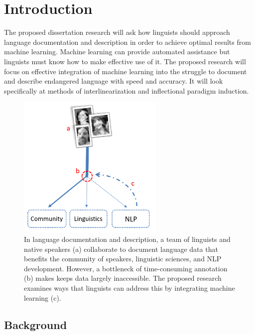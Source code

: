 \chapter{Introduction}
\label{introchap}

The proposed dissertation research will ask how linguists should approach language documentation and description in order to achieve optimal results from machine learning. Machine learning can provide automated assistance but linguists must know how to make effective use of it. The proposed research will focus on effective integration of machine learning into the struggle to document and describe endangered language with speed and accuracy. It will look specifically at methods of interlinearization and inflectional paradigm induction.

\begin{figure}[h]
\centering
\includegraphics[width=7cm]{figs/Flowchart.PNG}
\caption[Language Data Production]{In language documentation and description, a team of linguists and native speakers (a) collaborate to document language data that benefits the community of speakers, linguistic sciences, and NLP development. However, a bottleneck of time-consuming annotation (b) makes keeps data largely inaccessible. The proposed research examines ways that linguists can address this by integrating machine learning (c).}
\label{fig:flowchart}
\end{figure}

\section{Background}

